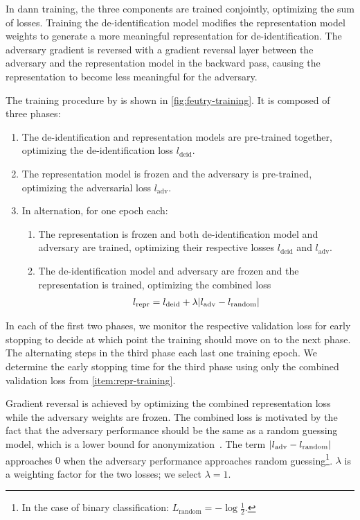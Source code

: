 %
In \ac{dann} training, the three components are trained conjointly, optimizing the sum of losses.
%
Training the de-identification model modifies the representation model weights to generate a more meaningful representation for de-identification.
%
The adversary gradient is reversed with a gradient reversal layer between the adversary and the representation model in the backward pass, causing the representation to become less meaningful for the adversary.

%
The training procedure by \citet{feutry2018learning} is shown in \cref{fig:feutry-training}.
%
It is composed of three phases:
%
\begin{enumerate}[label=P\arabic*.,ref=P\arabic*]
    \item The de-identification and representation models are pre-trained together, optimizing the de-identification loss $l_{\text{deid}}$.
    \item The representation model is frozen and the adversary is pre-trained, optimizing the adversarial loss $l_{\text{adv}}$.
    \item In alternation, for one epoch each:
    \begin{enumerate}
        \item The representation is frozen and both de-identification model and adversary are trained, optimizing their respective losses $l_{\text{deid}}$ and $l_{\text{adv}}$.
        \item The de-identification model and adversary are frozen and the representation is trained, optimizing the combined loss
        \begin{align}
            l_{\text{repr}} = l_{\text{deid}} + \lambda \lvert l_{\text{adv}} - l_{\text{random}}\rvert
        \end{align}
        \label{item:repr-training}
    \end{enumerate}
\end{enumerate}

%
In each of the first two phases, we monitor the respective validation loss for early stopping to decide at which point the training should move on to the next phase.
%
The alternating steps in the third phase each last one training epoch.
%
We determine the early stopping time for the third phase using only the combined validation loss from \ref{item:repr-training}.

%
Gradient reversal is achieved by optimizing the combined representation loss while the adversary weights are frozen.
%
The combined loss is motivated by the fact that the adversary performance should be the same as a random guessing model, which is a lower bound for anonymization~\citep{feutry2018learning}.
%
The term $\lvert l_{\text{adv}} - l_{\text{random}}\rvert$ approaches $0$ when the adversary performance approaches random guessing\footnote{In the case of binary classification: $L_{\text{random}} = -\log \frac{1}{2}$.}.
%
$\lambda$ is a weighting factor for the two losses; we select $\lambda=1$.

